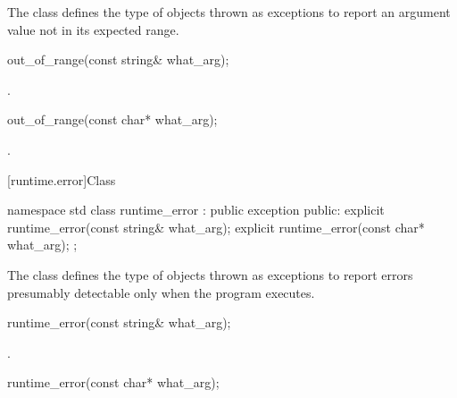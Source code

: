 \pnum
The class
defines the type of objects thrown as exceptions to report an
argument value not in its expected range.

%
\begin{itemdecl}
out_of_range(const string& what_arg);
\end{itemdecl}

\begin{itemdescr}

\pnum
\ensures
{}.
\end{itemdescr}

%
\begin{itemdecl}
out_of_range(const char* what_arg);
\end{itemdecl}

\begin{itemdescr}

\pnum
\ensures
{}.
\end{itemdescr}

[runtime.error]{Class }

%
\begin{codeblock}
namespace std {
  class runtime_error : public exception {
  public:
    explicit runtime_error(const string& what_arg);
    explicit runtime_error(const char* what_arg);
  };
}
\end{codeblock}

\pnum
The class
defines the type of objects thrown as exceptions to report errors presumably detectable only
when the program executes.

%
\begin{itemdecl}
runtime_error(const string& what_arg);
\end{itemdecl}

\begin{itemdescr}

\pnum
\ensures
{}.
\end{itemdescr}

%
\begin{itemdecl}
runtime_error(const char* what_arg);
\end{itemdecl}

